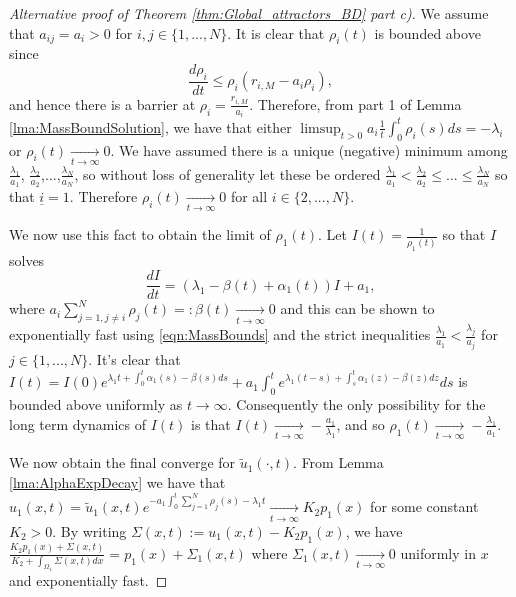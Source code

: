 \documentclass{article}
\begin{document}
\begin{proof}[Alternative proof of Theorem \ref{thm:Global_attractors_BD} part c)]
    We assume that $a_{ij}=a_i>0$ for $i,j\in\{1,...,N\}$. It is clear that $\rho_i(t)$ is bounded above since 
    \[\frac{d\rho_i}{dt}\leq{}\rho_i(r_{i,M}-a_i\rho_i),\]
    and hence there is a barrier at $\rho_i=\frac{r_{i,M}}{a_i}$. Therefore, from part 1 of Lemma \ref{lma:MassBoundSolution}, we have that either $\limsup_{t>0}a_i\frac{1}{t}\int_{0}^ t\rho_i(s)ds=-\lambda_i$ or $\rho_i(t)\xrightarrow[t\rightarrow\infty]{}0$.  We have assumed there is a unique (negative) minimum among $\frac{\lambda_1}{a_1}$, $\frac{\lambda_2}{a_2}$,...,$\frac{\lambda_N}{a_N}$, so without loss of generality let these be ordered $\frac{\lambda_1}{a_1}<\frac{\lambda_2}{a_2}\leq{}...\leq{}\frac{\lambda_N}{a_N}$ so that $\underline{i}=1$. Therefore  $\rho_i(t)\xrightarrow[t\rightarrow\infty]{}0$ for all $i\in\{2,...,N\}$. 
    
    We now use this fact to obtain the limit of $\rho_1(t)$. Let $I(t)=\frac{1}{\rho_{1}(t)}$ so that $I$ solves
    \[\frac{dI}{dt}=(\lambda_{1}-\beta(t)+\alpha_1(t))I+a_{1},\]
    where $a_{i}\sum_{j=1,j\neq{i}}^N\rho_j(t)=:\beta(t)\xrightarrow[t\rightarrow\infty]{}0$ and this can be shown to exponentially fast using \eqref{eqn:MassBounds} and the strict inequalities $\frac{\lambda_1}{a_1}<\frac{\lambda_j}{a_j}$ for $j\in\{1,...,N\}$.  It's clear that $I(t)=I(0)e^{\lambda_1t+\int_{0}^t\alpha_1(s)-\beta(s)ds}+a_{1}\int_{0}^t{}e^{\lambda_{1}(t-s)+\int_{s}^ t\alpha_1(z)-\beta(z)dz}ds$ is bounded above uniformly as $t\rightarrow\infty$.  Consequently the only possibility for the long term dynamics of $I(t)$ is that $I(t)\xrightarrow[t\rightarrow\infty]{}-\frac{a_1}{\lambda_1}$, and so $\rho_1(t)\xrightarrow[t\rightarrow\infty]{}-\frac{\lambda_1}{a_1}.$

We now obtain the final converge for $\tilde{u}_1(\cdot,t)$. From Lemma \ref{lma:AlphaExpDecay} we have that $u_1(x,t)=\tilde{u}_1(x,t)e^{-a_{1}\int_{0}^t\sum_{j=1}^N\rho_j(s)-\lambda_1t}\xrightarrow[t\rightarrow\infty]{}K_2p_1(x)$ for some constant $K_2>0$. By writing $\Sigma(x,t):=u_1(x,t)-K_2p_1(x)$, we have $\frac{K_2p_1(x)+\Sigma(x,t)}{K_2+\int_{\Omega_1}\Sigma(x,t)dx}=p_1(x)+\Sigma_1(x,t)$ where $\Sigma_1(x,t)\xrightarrow[t\rightarrow\infty]{}0$ uniformly in $x$ and exponentially fast.


    
\end{proof}
\end{document}
